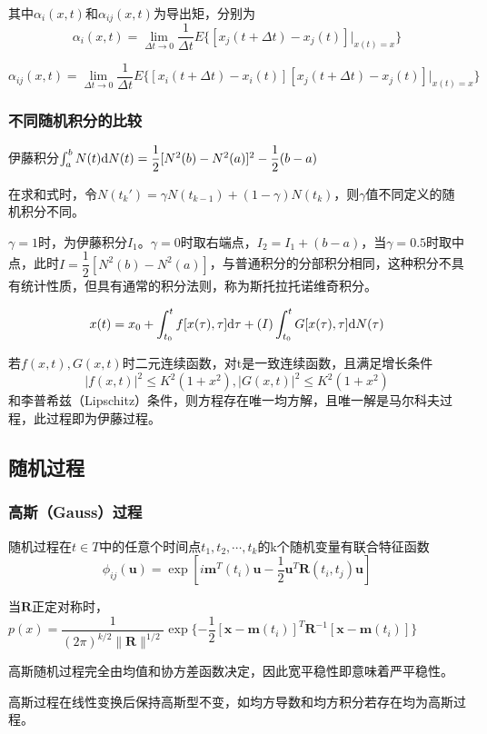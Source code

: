 \documentclass[11pt,a4paper]{ctexart}
\renewcommand{\d}{{\rm d}}
\begin{document}
        其中$\alpha_i(x,t)$和$\alpha_{ij}(x,t)$为导出矩，分别为
        \[
        \alpha_i(x,t)=\lim_{\Delta t\rightarrow0}\frac{1}{\Delta t}E\{[x_j(t+\Delta t)-x_j(t)]|_{x(t)=x}\}
        \]

        \[
        \alpha_{ij}(x,t)=\lim_{\Delta t\rightarrow0}\frac{1}{\Delta t}E\{[x_i(t+\Delta t)-x_i(t)][x_j(t+\Delta t)-x_j(t)]|_{x(t)=x}\}
        \]  
    \subsubsection{不同随机积分的比较} 
        伊藤积分$\int_a^bN(t)\d N(t)=\dfrac12[N^2(b)-N^2(a)]^2-\dfrac12(b-a)$

        在求和式时，令$N(t_k')=\gamma N(t_{k-1})+(1-\gamma)N(t_{k})$，则$\gamma$值不同定义的随机积分不同。

        $\gamma=1$时，为伊藤积分$I_1$。$\gamma=0$时取右端点，$I_2=I_1+(b-a)$，当$\gamma=0.5$时取中点，此时$I=\dfrac12[N^2(b)-N^2(a)]$，与普通积分的分部积分相同，这种积分不具有统计性质，但具有通常的积分法则，称为斯托拉托诺维奇积分。

        \[
        x(t)=x_0+\int_{t_0}^tf[x(\tau),\tau]\d\tau+(I)\int_{t_0}^tG[x(\tau),\tau]\d N(\tau)
        \]

        若$f(x,t),G(x,t)$时二元连续函数，对t是一致连续函数，且满足增长条件
        \[
        |f(x,t)|^2\leqslant K^2(1+x^2),|G(x,t)|^2\leqslant K^2(1+x^2)
        \]
        和李普希兹（Lipschitz）条件，则方程存在唯一均方解，且唯一解是马尔科夫过程，此过程即为伊藤过程。
    \subsection{随机过程}
        \subsubsection{高斯（Gauss）过程}
            随机过程在$t\in T$中的任意个时间点$t_1,t_2,\cdots,t_k$的k个随机变量有联合特征函数
            \[
            \phi_{ij}(\bm{u})=\exp[i\bm{m}^T(t_i)\bm{u}-\frac{1}{2}\bm{u}^T\bm{R}(t_i,t_j)\bm{u}]
            \]

            当$\bm{R}$正定对称时，$p(x)=\dfrac{1}{(2\pi)^{k/2}\|\bm{R}\|^{1/2}}\exp\{-\dfrac12[\bm{x}-\bm{m}(t_i)]^T\bm{R}^{-1}[\bm{x}-\bm{m}(t_i)]\}$

            高斯随机过程完全由均值和协方差函数决定，因此宽平稳性即意味着严平稳性。

            高斯过程在线性变换后保持高斯型不变，如均方导数和均方积分若存在均为高斯过程。
\end{document}
